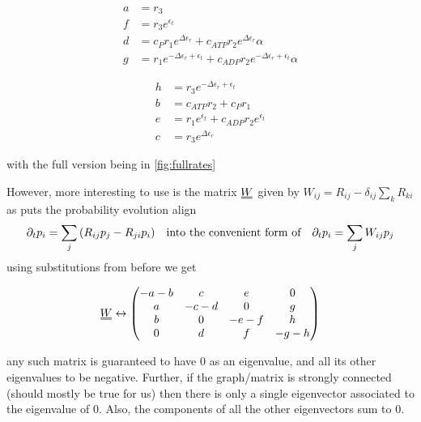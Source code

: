\documentclass[11pt]{article}
\newcommand{\duf}[2]{\stackunder[0.5pt]{\stackunder[0.8pt]{\stackunder[1pt]{\ensuremath{#1}}{\rule{\widthof{\ensuremath{#2}}*\real{0.9}}{.1ex}}}{\rule{\widthof{\ensuremath{#2}}*\real{0.9}}{.1ex}}}{}}
\newcommand{\du}[1]{\duf{#1}{#1}}
\begin{document}
\begin{minipage}{0.45\textwidth}
    \begin{align}
        a &= r_3 \\
        f &= r_3 e^{\epsilon_{t}} \\
        d &= c_P r_1 e^{\Delta\epsilon_{r}} + c_{ATP} r_2 e^{\Delta\epsilon_{r}} \alpha \\
        g &= r_1 e^{ - \Delta\epsilon_{r} + \epsilon_{t}} + c_{ADP} r_2 e^{ - \Delta\epsilon_{r} + \epsilon_{t}} \alpha
    \end{align}
\end{minipage}
\begin{minipage}{0.45\textwidth}
    \begin{align}
        h &= r_3 e^{ - \Delta\epsilon_{r} + \epsilon_{t}} \\
        b &= c_{ATP} r_2 + c_P r_1 \\
        e &= r_1 e^{\epsilon_{t}} + c_{ADP} r_2 e^{\epsilon_{t}} \\
        c &= r_3 e^{\Delta\epsilon_{r}}
    \end{align}
\end{minipage}

with the full version being in \cref{fig:fullrates}

However, more interesting to use is the matrix $\du{W}$ given by $W_{ij}=R_{ij}-\delta_{ij}\sum_k R_{ki}$ as puts the probability evolution align
\begin{equation}
    \partial_t p_i = \sum_j \qty(R_{ij}p_j - R_{ji}p_i) \qq{into the convenient form of} \partial_t p_i = \sum_j W_{ij}p_j
\end{equation}
using substitutions from before we get
\begin{tcolorbox}
    \begin{equation}\label{eq:W}
        \du{W} \leftrightarrow \begin{pmatrix}
        -a-b & c & e & 0 \\
        a & -c-d & 0 & g \\
        b & 0 & -e-f & h \\
        0 & d & f & -g-h \\
        \end{pmatrix}
    \end{equation}
\end{tcolorbox}
any such matrix is guaranteed to have 0 as an eigenvalue, and all its other eigenvalues to be negative.
Further, if the graph/matrix is strongly connected (should mostly be true for us) then there is only a single eigenvector associated to the eigenvalue of 0.
Also, the components of all the other eigenvectors sum to 0.
\end{document}
